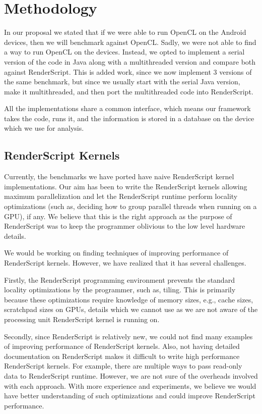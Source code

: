 
\section*{Methodology}

In our proposal we stated that if we were able to run OpenCL on the Android devices, then
  we will benchmark against OpenCL.
Sadly, we were not able to find a way to run OpenCL on the devices.
Instead, we opted to implement a serial version of the code in Java along with a multithreaded version
  and compare both against RenderScript.
This is added work, since we now implement 3 versions of the same benchmark, but since we usually
  start with the serial Java version, make it multithreaded, and then port the multithreaded code
  into RenderScript.

All the implementations share a common interface, which means our framework takes the code,
  runs it, and the information is stored in a database on the device which we use for analysis.

\subsection*{RenderScript Kernels}
Currently, the benchmarks we have ported have naive RenderScript kernel
implementations. Our aim has been to write the RenderScript kernels allowing maximum
parallelization and let the RenderScript runtime  perform locality
optimizations (such as, deciding how to group parallel threads when running on a
GPU), if any. We believe that this is the right approach as
the purpose of RenderScript was to keep the programmer oblivious to the low
level hardware details.

We would be working on finding techniques of improving performance of
RenderScript kernels. However, we have realized that it has several challenges.

Firstly, the RenderScript programming environment prevents the standard locality
optimizations by the programmer, such as, tiling. This is primarily because
these optimizations require knowledge of memory sizes, e.g., cache sizes,
scratchpad sizes on GPUs, details which we cannot use as we are not aware of the
processing unit RenderScript kernel is running on.

Secondly, since RenderScript is relatively new, we could not find many examples
of improving performance of RenderScript kernels. Also, not having detailed
documentation on RenderScript makes it difficult to write high performance
RenderScript kernels. For example, there are multiple ways to pass read-only
data to RenderScript runtime. However, we are not sure of the overheads involved
with each approach. With more experience and
experiments, we believe we would have better understanding of such optimizations
and could improve RenderScript performance.

